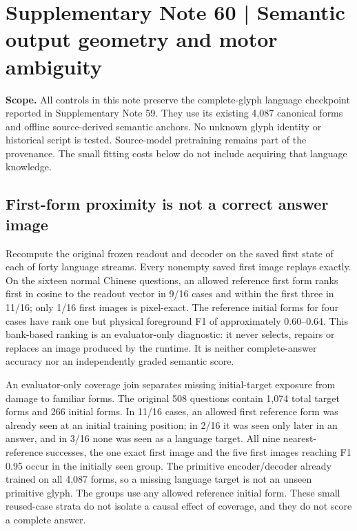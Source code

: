 \clearpage
\section*{Supplementary Note 60 | Semantic output geometry and motor ambiguity}

\textbf{Scope.}
All controls in this note preserve the complete-glyph language checkpoint
reported in Supplementary Note 59. They use its existing 4,087 canonical
forms and offline source-derived semantic anchors. No unknown glyph
identity or historical script is tested. Source-model pretraining remains
part of the provenance. The small fitting costs below do not include
acquiring that language knowledge.

\subsection*{First-form proximity is not a correct answer image}
Recompute the original frozen readout and decoder on the saved first state
of each of forty language streams. Every nonempty saved first image replays
exactly. On the sixteen normal Chinese questions, an allowed reference
first form ranks first in cosine to the readout vector in 9/16 cases and
within the first three in 11/16; only 1/16 first images is pixel-exact.
The reference initial forms for four cases have rank one but physical
foreground F1 of approximately 0.60--0.64. This bank-based ranking is an
evaluator-only diagnostic: it never selects, repairs or replaces an
image produced by the runtime. It is neither complete-answer accuracy nor
an independently graded semantic score.

An evaluator-only coverage join separates missing initial-target exposure
from damage to familiar forms. The original 508 questions contain 1,074 total
target forms and 266 initial forms. In 11/16 cases, an allowed first reference
form was already seen at an initial training position; in 2/16 it was seen
only later in an answer, and in 3/16 none was seen as a language target.
All nine nearest-reference successes, the one exact first image and the five
first images reaching F1 0.95 occur in the initially seen group. The primitive
encoder/decoder already trained on all 4,087 forms, so a missing language
target is not an unseen primitive glyph. The groups use any allowed reference
initial form. These small reused-case strata do not isolate a causal effect
of coverage, and they do not score a complete answer.

